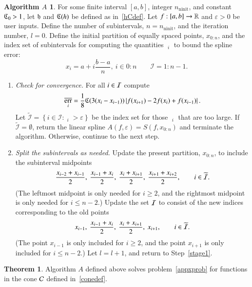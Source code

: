 \documentclass[review]{elsarticle}
\newcommand{\abstol}{\varepsilon}
\newcommand{\zton}{0\!:\!n}
\theoremstyle{definition}
\newtheorem*{algoA}{Algorithm $A$}
\DeclareMathOperator{\ninit}{ninit}
\DeclareMathOperator{\oerr}{\overline{err}}
\newtheorem{theorem}{Theorem}
\begin{document}
\begin{algoA} \label{AlgoA}
For some finite interval $[a,b]$, integer $n_{\ninit}$, and constant $\mathfrak{C}_0 >
1$, let $\mathfrak{h}$ and $\mathfrak{C}(h)$ be defined as in~\eqref{hCdef}. Let $f:[a,b] \to
\mathbb{R}$ and $\abstol >0$ be user inputs. Define the number of subintervals,
$n=n_{\ninit}$, and the iteration number, $l = 0$. Define the initial partition
of equally spaced points, $x_{0:n}$, and the index set of subintervals for
computing the quantities $\oerr_i$ to bound the spline error:
\[
x_i=a+ i\frac{b-a}{n}, \ i \in \zton \qquad \mathcal{I} = 1\!:\!n-1.
\]

\begin{enumerate}[\em Step 1.]

\item \label{stage1} \emph{Check for convergence.} For all $i \in \mathcal{I}$ compute
\begin{equation} \label{oerrdef}
\oerr_i = \frac{1}{8} \fC(3(x_i - x_{i-1}))\abs{f(x_{i+1}) - 2f(x_i) + f(x_{i-1})}.
\end{equation}
Let $\widetilde{\mathcal{I}} = \left\{i \in \mathcal{I}: \oerr_i  > \abstol \right\}$ 
be the index set for those $\oerr_i $ that are too large.   If $\widetilde{\mathcal{I}} =
\emptyset$, return the linear spline $A(f,\abstol) = S(f, x_{0:n})$ and terminate
the algorithm. Otherwise, continue to the next step.

\item \label{stage2} \emph{Split the subintervals as needed.} 
Update the present partition, $x_{0:n}$, to include the subinterval midpoints
\[
  \frac{x_{i-2} +x_{i-1}}{2}, \ \frac{x_{i-1} +x_{i}}{2}, 
\ \frac{x_{i} +x_{i+1}}{2}, \  \frac{x_{i+1} +x_{i+2}}{2}, \qquad i \in \widetilde{\mathcal{I}}.
\] 
(The leftmost midpoint is only needed for $i \ge 2$, and the rightmost midpoint
is only needed for $i \le n-2$.) Update the set $\mathcal{I}$ to consist of the new
indices corresponding to the old points
\[
x_{i-1}, \ \frac{x_{i-1} +x_{i}}{2}, \ \frac{x_{i} +x_{i+1}}{2}, \  x_{i+1}, \qquad i \in \widetilde{\ci}.
\] 
(The point $x_{i-1}$ is only included for $ i \ge 2$, and the point $x_{i+1}$ is
only included for $i \le n-2$.) Let $l = l+1$, and return to Step~\ref{stage1}.
\end{enumerate}
\end{algoA}

\begin{theorem} \label{thm:algAworks}
	Algorithm $A$ defined above solves problem~\eqref{appxprob} for functions in the
	cone $\mathcal{C}$ defined in~\eqref{conedef}.
\end{theorem}
\end{document}
